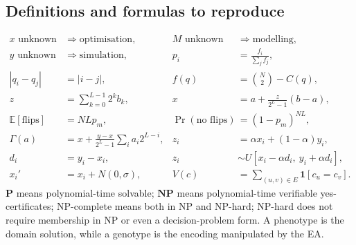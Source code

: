\documentclass[11pt,a4paper]{article}
\begin{document}
\subsection{Definitions and formulas to reproduce}
{\small
\begin{align*}
  x\text{ unknown}&\Rightarrow\text{optimisation},&
  M\text{ unknown}&\Rightarrow\text{modelling},\\
  y\text{ unknown}&\Rightarrow\text{simulation},&
  p_i&=\frac{f_i}{\sum_j f_j},\\
  |q_i-q_j|&=|i-j|,&
  f(q)&=\binom N2-C(q),\\
  z&=\sum_{k=0}^{L-1}2^k b_k,&
  x&=a+\frac{z}{2^L-1}(b-a),\\
  \mathbb E[\text{flips}]&=NLp_m,&
  \Pr(\text{no flips})&=(1-p_m)^{NL},\\
  \Gamma(a)&=x+\tfrac{y-x}{2^L-1}\textstyle\sum_i a_i2^{L-i},&
  z_i&=\alpha x_i+(1-\alpha)y_i,\\
  d_i&=y_i-x_i,&
  z_i&\sim U[x_i-\alpha d_i,\ y_i+\alpha d_i],\\
  x_i'&=x_i+N(0,\sigma),&
  V(c)&=\textstyle\sum_{(u,v)\in E}\mathbf 1[c_u=c_v].
\end{align*}
}
\noindent
$\mathbf P$ means polynomial-time solvable; $\mathbf{NP}$ means
polynomial-time verifiable yes-certificates; NP-complete means both in NP and
NP-hard; NP-hard does not require membership in NP or even a decision-problem
form. A phenotype is the domain solution, while a genotype is the encoding
manipulated by the EA.
\end{document}
